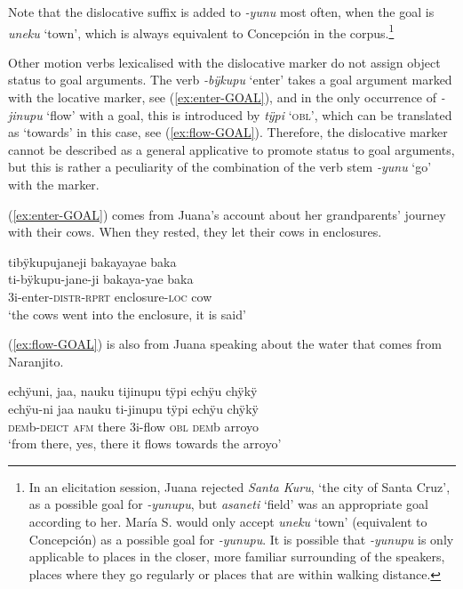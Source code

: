 Note that the dislocative suffix is added to \textit{-yunu} most often, when the goal is \textit{uneku} ‘town’, which is always equivalent to Concepción in the corpus.\footnote{In an elicitation session, Juana rejected \textit{Santa Kuru}, ‘the city of Santa Cruz’, as a possible goal for \textit{-yunupu}, but \textit{asaneti} ‘field’ was an appropriate goal according to her. María S. would only accept \textit{uneku} ‘town’ (equivalent to Concepción) as a possible goal for \textit{-yunupu}. It is possible that \textit{-yunupu} is only applicable to places in the closer, more familiar surrounding of the speakers, places where they go regularly or places that are within walking distance.}

Other motion verbs lexicalised with the dislocative marker do not assign object status to goal arguments. The verb \textit{-bÿkupu} ‘enter’ takes a goal argument marked with the locative marker, see (\ref{ex:enter-GOAL}), and in the only occurrence of \textit{-jinupu} ‘flow’ with a goal, this is introduced by \textit{tÿpi} ‘\textsc{obl}’, which can be translated as ‘towards’ in this case, see (\ref{ex:flow-GOAL}). Therefore, the dislocative marker cannot be described as a general applicative to promote  status to goal arguments, but this is rather a peculiarity of the combination of the verb stem \textit{-yunu} ‘go’ with the marker.

(\ref{ex:enter-GOAL}) comes from Juana’s account about her grandparents’ journey with their cows. When they rested, they let their cows in enclosures.

\ea\label{ex:enter-GOAL}
\begingl 
\glpreamble tibÿkupujaneji bakayayae baka\\
\gla ti-bÿkupu-jane-ji bakaya-yae baka \\ 
\glb 3i-enter-\textsc{distr}-\textsc{rprt} enclosure-\textsc{loc} cow\\ 
\glft ‘the cows went into the enclosure, it is said’
\trailingcitation{[jxx-p151016l-2]}
\xe

(\ref{ex:flow-GOAL}) is also from Juana speaking about the water that comes from Naranjito.

\ea\label{ex:flow-GOAL}
\begingl 
\glpreamble echÿuni, jaa, nauku tijinupu tÿpi echÿu chÿkÿ\\
\gla echÿu-ni jaa nauku ti-jinupu tÿpi echÿu chÿkÿ\\ 
\glb \textsc{dem}b-\textsc{deict} \textsc{afm} there 3i-flow \textsc{obl} \textsc{dem}b arroyo\\ 
\glft ‘from there, yes, there it flows towards the arroyo’
\trailingcitation{[jxx-p120515l-2.129-131]}
\xe
{}

